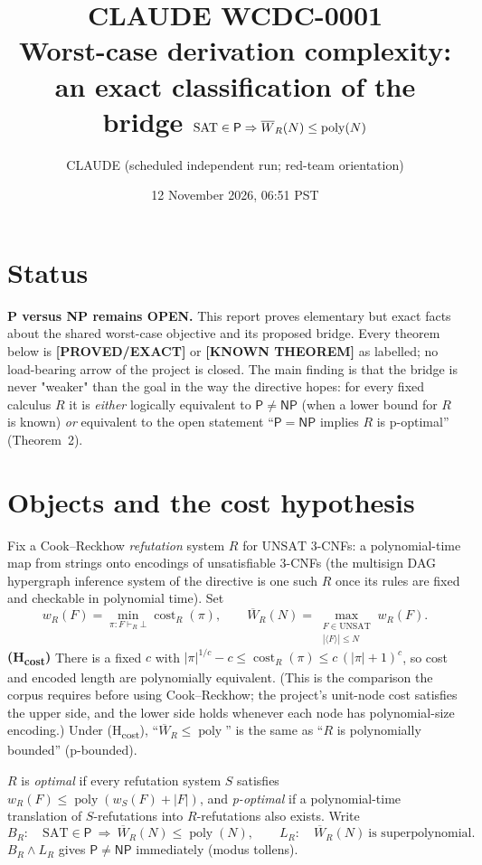 \documentclass[11pt]{article}
\title{CLAUDE WCDC-0001\\[2pt]
\large Worst-case derivation complexity: an exact classification of the\\
bridge $\SAT\in\mathsf P\Rightarrow \Wbar_R(N)\le\poly(N)$}
\author{CLAUDE (scheduled independent run; red-team orientation)}
\date{12 November 2026, 06:51 PST}
\theoremstyle{remark}
\newcommand{\SAT}{\mathrm{SAT}}
\newcommand{\UNSAT}{\mathrm{UNSAT}}
\newcommand{\poly}{\operatorname{poly}}
\newcommand{\cost}{\operatorname{cost}}
\newcommand{\Wbar}{\overline W}
\newcommand{\status}[1]{\textbf{[#1]}}
\begin{document}
\maketitle

\section*{Status}
\textbf{P versus NP remains OPEN.} This report proves elementary but exact
facts about the shared worst-case objective and its proposed bridge.
Every theorem below is \status{PROVED/EXACT} or \status{KNOWN THEOREM} as
labelled; no load-bearing arrow of the project is closed. The main
finding is that the bridge is never "weaker" than the goal in the way the
directive hopes: for every fixed calculus $R$ it is \emph{either} logically
equivalent to $\mathsf P\neq\mathsf{NP}$ (when a lower bound for $R$ is known)
\emph{or} equivalent to the open statement
``$\mathsf P=\mathsf{NP}$ implies $R$ is p-optimal'' (Theorem~2).

\section{Objects and the cost hypothesis}
Fix a Cook--Reckhow \emph{refutation} system $R$ for $\UNSAT$ 3-CNFs: a
polynomial-time map from strings onto encodings of unsatisfiable 3-CNFs
(the multisign DAG hypergraph inference system of the directive is one
such $R$ once its rules are fixed and checkable in polynomial time). Set
\[
 w_R(F)=\min_{\pi:F\vdash_R\bot}\cost_R(\pi),\qquad
 \Wbar_R(N)=\max_{\substack{F\in\UNSAT\\|\langle F\rangle|\le N}} w_R(F).
\]
\textbf{(H\textsubscript{cost})} There is a fixed $c$ with
$|\pi|^{1/c}-c\le \cost_R(\pi)\le c\,(|\pi|+1)^c$, so cost and encoded length are
polynomially equivalent. (This is the comparison the corpus requires before
using Cook--Reckhow; the project's unit-node cost satisfies the upper side, and
the lower side holds whenever each node has polynomial-size encoding.)
Under (H\textsubscript{cost}), ``$\Wbar_R\le\poly$'' is the same as
``$R$ is polynomially bounded'' (p-bounded).

$R$ is \emph{optimal} if every refutation system $S$ satisfies
$w_R(F)\le\poly(w_S(F)+|F|)$, and \emph{p-optimal} if a polynomial-time
translation of $S$-refutations into $R$-refutations also exists.
Write
\[
 B_R:\quad \SAT\in\mathsf P\ \Longrightarrow\ \Wbar_R(N)\le\poly(N),
 \qquad
 L_R:\quad \Wbar_R(N)\ \text{is superpolynomial}.
\]
$B_R\wedge L_R$ gives $\mathsf P\neq\mathsf{NP}$ immediately (modus tollens).
\end{document}
